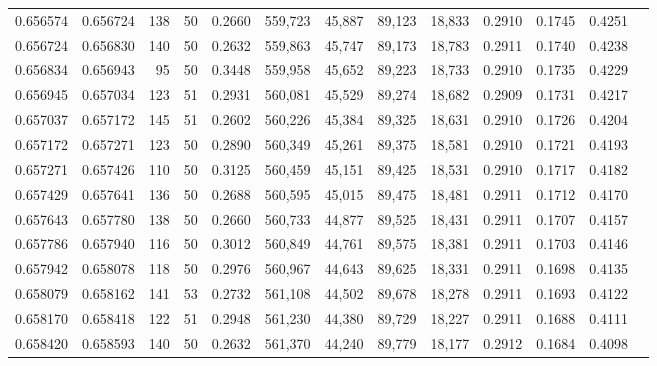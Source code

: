 \begin{tabular}{rrrrrrrrrrrrr}
0.656574 & 0.656724 &   138 &  50 &                                     0.2660 & 559,723 &  45,887 &  89,123 &  18,833 & 0.2910 & 0.1745 & 0.4251 \\
0.656724 & 0.656830 &   140 &  50 &                                     0.2632 & 559,863 &  45,747 &  89,173 &  18,783 & 0.2911 & 0.1740 & 0.4238 \\
0.656834 & 0.656943 &    95 &  50 &                                     0.3448 & 559,958 &  45,652 &  89,223 &  18,733 & 0.2910 & 0.1735 & 0.4229 \\
0.656945 & 0.657034 &   123 &  51 &                                     0.2931 & 560,081 &  45,529 &  89,274 &  18,682 & 0.2909 & 0.1731 & 0.4217 \\
0.657037 & 0.657172 &   145 &  51 &                                     0.2602 & 560,226 &  45,384 &  89,325 &  18,631 & 0.2910 & 0.1726 & 0.4204 \\
0.657172 & 0.657271 &   123 &  50 &                                     0.2890 & 560,349 &  45,261 &  89,375 &  18,581 & 0.2910 & 0.1721 & 0.4193 \\
0.657271 & 0.657426 &   110 &  50 &                                     0.3125 & 560,459 &  45,151 &  89,425 &  18,531 & 0.2910 & 0.1717 & 0.4182 \\
0.657429 & 0.657641 &   136 &  50 &                                     0.2688 & 560,595 &  45,015 &  89,475 &  18,481 & 0.2911 & 0.1712 & 0.4170 \\
0.657643 & 0.657780 &   138 &  50 &                                     0.2660 & 560,733 &  44,877 &  89,525 &  18,431 & 0.2911 & 0.1707 & 0.4157 \\
0.657786 & 0.657940 &   116 &  50 &                                     0.3012 & 560,849 &  44,761 &  89,575 &  18,381 & 0.2911 & 0.1703 & 0.4146 \\
0.657942 & 0.658078 &   118 &  50 &                                     0.2976 & 560,967 &  44,643 &  89,625 &  18,331 & 0.2911 & 0.1698 & 0.4135 \\
0.658079 & 0.658162 &   141 &  53 &                                     0.2732 & 561,108 &  44,502 &  89,678 &  18,278 & 0.2911 & 0.1693 & 0.4122 \\
0.658170 & 0.658418 &   122 &  51 &                                     0.2948 & 561,230 &  44,380 &  89,729 &  18,227 & 0.2911 & 0.1688 & 0.4111 \\
0.658420 & 0.658593 &   140 &  50 &                                     0.2632 & 561,370 &  44,240 &  89,779 &  18,177 & 0.2912 & 0.1684 & 0.4098 \\

\end{tabular}
